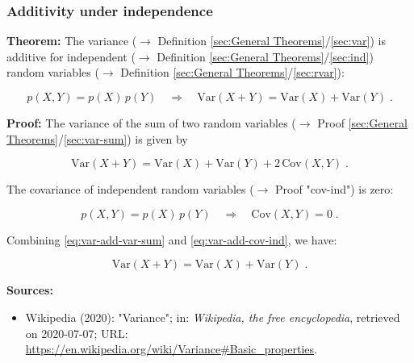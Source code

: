 \documentclass[a4paper,12pt,twoside]{book}
\begin{document}
\subsubsection[\textbf{Additivity under independence}]{Additivity under independence} \label{sec:var-add}
\setcounter{equation}{0}

\textbf{Theorem:} The variance ($\rightarrow$ Definition \ref{sec:General Theorems}/\ref{sec:var}) is additive for independent ($\rightarrow$ Definition \ref{sec:General Theorems}/\ref{sec:ind}) random variables ($\rightarrow$ Definition \ref{sec:General Theorems}/\ref{sec:rvar}):

\begin{equation} \label{eq:var-add-var-add}
p(X,Y) = p(X) \, p(Y) \quad \Rightarrow \quad \mathrm{Var}(X+Y) = \mathrm{Var}(X) + \mathrm{Var}(Y) \; .
\end{equation}


\vspace{1em}
\textbf{Proof:} The variance of the sum of two random variables ($\rightarrow$ Proof \ref{sec:General Theorems}/\ref{sec:var-sum}) is given by

\begin{equation} \label{eq:var-add-var-sum}
\mathrm{Var}(X+Y) = \mathrm{Var}(X) + \mathrm{Var}(Y) + 2 \, \mathrm{Cov}(X,Y) \; .
\end{equation}

The covariance of independent random variables ($\rightarrow$ Proof "cov-ind") is zero:

\begin{equation} \label{eq:var-add-cov-ind}
p(X,Y) = p(X) \, p(Y) \quad \Rightarrow \quad \mathrm{Cov}(X,Y) = 0 \; .
\end{equation}

Combining \eqref{eq:var-add-var-sum} and \eqref{eq:var-add-cov-ind}, we have:

\begin{equation} \label{eq:var-add-var-add-qed}
\mathrm{Var}(X+Y) = \mathrm{Var}(X) + \mathrm{Var}(Y) \; .
\end{equation}


\vspace{1em}
\textbf{Sources:}
\begin{itemize}
\item Wikipedia (2020): "Variance"; in: \textit{Wikipedia, the free encyclopedia}, retrieved on 2020-07-07; URL: \url{https://en.wikipedia.org/wiki/Variance#Basic_properties}.
\end{itemize}
\end{document}
